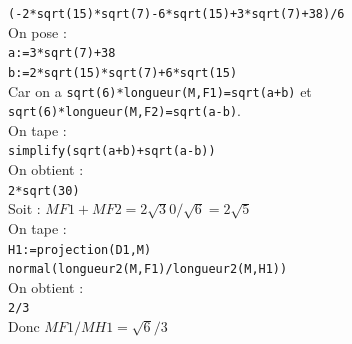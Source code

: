 \documentclass[a4paper,11pt]{book}
\begin{document}
{\tt (-2*sqrt(15)*sqrt(7)-6*sqrt(15)+3*sqrt(7)+38)/6}\\
On pose :\\
{\tt a:=3*sqrt(7)+38}\\
{\tt b:=2*sqrt(15)*sqrt(7)+6*sqrt(15)}\\
Car on a {\tt sqrt(6)*longueur(M,F1)=sqrt(a+b)} et\\
 {\tt sqrt(6)*longueur(M,F2)=sqrt(a-b)}.\\
On tape :\\
{\tt simplify(sqrt(a+b)+sqrt(a-b))}\\
On obtient :\\
{\tt 2*sqrt(30)}\\
Soit : $MF1+MF2=2\sqrt 30/\sqrt 6=2\sqrt 5$\\
On tape :\\
{\tt H1:=projection(D1,M)}\\
{\tt normal(longueur2(M,F1)/longueur2(M,H1))}\\
On obtient :\\
{\tt 2/3}\\
Donc  $MF1/MH1=\sqrt6/3$
\end{document}
